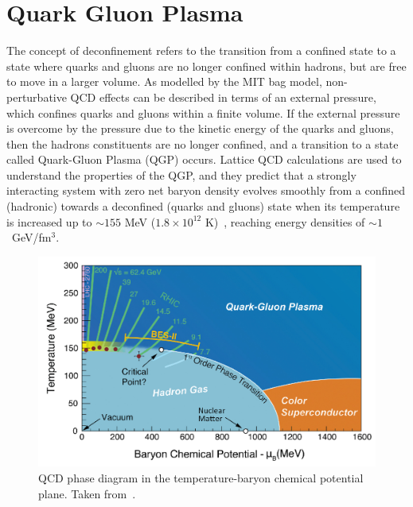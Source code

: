 \section{Quark Gluon Plasma}
The concept of deconfinement refers to the transition from a confined state to a state where quarks and gluons are no longer confined within hadrons, but are free to move in a larger volume. As modelled by the MIT bag model, non-perturbative QCD effects can be described in terms of an external pressure, which confines quarks and gluons within a finite volume. If the external pressure is overcome by the pressure due to the kinetic energy of the quarks and gluons, then the hadrons constituents are no longer confined, and a transition to a state called Quark-Gluon Plasma (QGP) occurs. Lattice QCD calculations are used to understand the properties of the QGP, and they predict that a strongly interacting system with zero net baryon density evolves smoothly from a confined (hadronic) towards a deconfined (quarks and gluons) state when its temperature is increased up to $\sim155$ MeV ($1.8\times 10^{12}$ K)~\cite{HotQCD:2014kol, Borsanyi:2013bia}, reaching energy densities of $\sim 1$~GeV/fm$^3$.

\begin{figure}
  \centering
  \includegraphics[width=0.7\linewidth]{Figures/Chapter 1/QCD-diagram.jpg}
  \caption{QCD phase diagram in the temperature-baryon chemical potential plane. Taken from~\cite{QCD_diagram}.}
  \label{fig:PhaseDiagram}
\end{figure}

